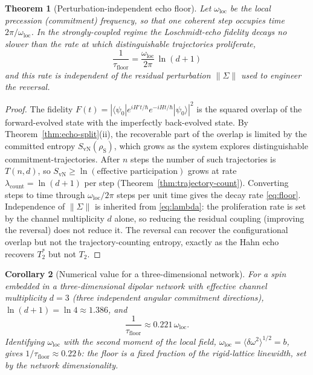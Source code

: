 \documentclass[twocolumn,10pt,a4paper]{article}
\theoremstyle{thmstyle}
\newtheorem{theorem}{Theorem}[section]
\newtheorem{corollary}[theorem]{Corollary}
\theoremstyle{definition}
\theoremstyle{remark}
\newcommand{\sysrho}{\rho_{\mathrm{S}}}
\newcommand{\Svn}{S_{\mathrm{vN}}}
\newcommand{\Ttwo}{T_{2}}
\newcommand{\Tstar}{T_{2}^{\ast}}
\begin{document}
\begin{theorem}[Perturbation-independent echo floor]
\label{thm:floor}
Let $\omega_{\mathrm{loc}}$ be the local precession (commitment) frequency,
so that one coherent step occupies time $2\pi/\omega_{\mathrm{loc}}$. In
the strongly-coupled regime the Loschmidt-echo fidelity decays no slower
than the rate at which distinguishable trajectories proliferate,
\begin{equation}
\boxed{\;\frac{1}{\tau_{\mathrm{floor}}}
=\frac{\omega_{\mathrm{loc}}}{2\pi}\,\ln(d+1)\;}
\label{eq:floor}
\end{equation}
and this rate is independent of the residual perturbation $\|\Sigma\|$ used
to engineer the reversal.
\end{theorem}

\begin{proof}
The fidelity $F(t)=|\langle\psi_{0}|e^{iH't/\hbar}e^{-iHt/\hbar}|\psi_{0}
\rangle|^{2}$ is the squared overlap of the forward-evolved state with the
imperfectly back-evolved state. By Theorem~\ref{thm:echo-split}(ii), the
recoverable part of the overlap is limited by the committed entropy
$\Svn(\sysrho)$, which grows as the system explores distinguishable
commitment-trajectories. After $n$ steps the number of such trajectories
is $T(n,d)$, so $\Svn\geq\ln(\text{effective participation})$ grows at rate
$\lambda_{\mathrm{count}}=\ln(d+1)$ per step
(Theorem~\ref{thm:trajectory-count}). Converting steps to time through
$\omega_{\mathrm{loc}}/2\pi$ steps per unit time gives the decay rate
\eqref{eq:floor}. Independence of $\|\Sigma\|$ is inherited from
\eqref{eq:lambda}: the proliferation rate is set by the channel
multiplicity $d$ alone, so reducing the residual coupling (improving the
reversal) does not reduce it. The reversal can recover the configurational
overlap but not the trajectory-counting entropy, exactly as the Hahn echo
recovers $\Tstar$ but not $\Ttwo$.
\end{proof}

\begin{corollary}[Numerical value for a three-dimensional network]
\label{cor:numerics}
For a spin embedded in a three-dimensional dipolar network with effective
channel multiplicity $d=3$ (three independent angular commitment
directions), $\ln(d+1)=\ln 4\approx 1.386$, and
\begin{equation}
\frac{1}{\tau_{\mathrm{floor}}}\approx 0.221\,\omega_{\mathrm{loc}}.
\label{eq:numeric-floor}
\end{equation}
Identifying $\omega_{\mathrm{loc}}$ with the second moment of the local
field, $\omega_{\mathrm{loc}}=\langle\delta\omega^{2}\rangle^{1/2}=b$, gives
$1/\tau_{\mathrm{floor}}\approx 0.22\,b$: the floor is a fixed fraction of
the rigid-lattice linewidth, set by the network dimensionality.
\end{corollary}
\end{document}
